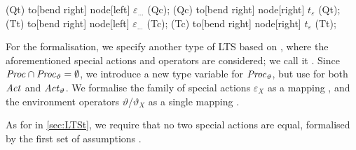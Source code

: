 \begin{isabellebody}
\begin{isamarkuptext}
{{    \draw [dotted,->,shorten >= 7pt] (Qt) to[bend right] node[left] {$\varepsilon_{\dots}$} (Qc);
    \draw [dotted,->,shorten <= 7pt] (Qc) to[bend right] node[right] {$t_\varepsilon$} (Qt);
    \draw [dotted,->,shorten >= 7pt] (Tt) to[bend right] node[left] {$\varepsilon_{\dots}$} (Tc);
    \draw [dotted,->,shorten <= 7pt] (Tc) to[bend right] node[right] {$t_\varepsilon$} (Tt);
}}%
\end{isamarkuptext}\isamarkuptrue%
%
\isadelimdocument
%
\endisadelimdocument
%
\isatagdocument
%
\isamarkuptrue%
%
\isamarkuptrue%
%
\endisatagdocument
{\isafolddocument}%
%
\isadelimdocument
%
\endisadelimdocument
%
\begin{isamarkuptext}%
For the formalisation, we specify another type of LTS based on , where the aforementioned special actions and operators are considered; we call it . 
Since $\mathit{Proc} \cap \mathit{Proc}_\vartheta = \emptyset$, we introduce a new type variable  for $\mathit{Proc}_\vartheta$, but use  for both $\mathit{Act}$ and $\mathit{Act}_\vartheta$.
We formalise the family of special actions $\varepsilon_X$ as a mapping , and the environment operators $\vartheta$/$\vartheta_X$ as a single mapping .

As for  in \cref{sec:LTSt}, we require that no two special actions are equal, formalised by the first set of assumptions .


\end{isamarkuptext}
\end{isabellebody}

